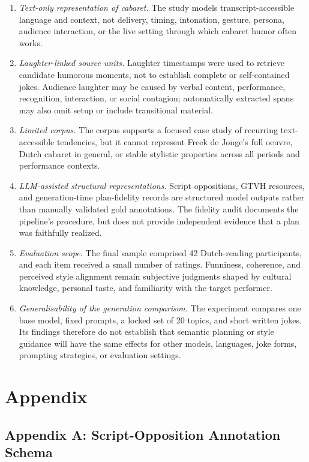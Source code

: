\documentclass[11pt]{article}
\providecommand{\tightlist}{}
\begin{document}
\begin{enumerate}
\def\labelenumi{\arabic{enumi}.}
\tightlist
\item
  \emph{Text-only representation of cabaret.} The study models transcript-accessible language and context, not delivery, timing, intonation, gesture, persona, audience interaction, or the live setting through which cabaret humor often works.
\item
  \emph{Laughter-linked source units.} Laughter timestamps were used to retrieve candidate humorous moments, not to establish complete or self-contained jokes. Audience laughter may be caused by verbal content, performance, recognition, interaction, or social contagion; automatically extracted spans may also omit setup or include transitional material.
\item
  \emph{Limited corpus.} The corpus supports a focused case study of recurring text-accessible tendencies, but it cannot represent Freek de Jonge's full oeuvre, Dutch cabaret in general, or stable stylistic properties across all periods and performance contexts.
\item
  \emph{LLM-assisted structural representations.} Script oppositions, GTVH resources, and generation-time plan-fidelity records are structured model outputs rather than manually validated gold annotations. The fidelity audit documents the pipeline's procedure, but does not provide independent evidence that a plan was faithfully realized.
\item
  \emph{Evaluation scope.} The final sample comprised 42 Dutch-reading participants, and each item received a small number of ratings. Funniness, coherence, and perceived style alignment remain subjective judgments shaped by cultural knowledge, personal taste, and familiarity with the target performer.
\item
  \emph{Generalisability of the generation comparison.} The experiment compares one base model, fixed prompts, a locked set of 20 topics, and short written jokes. Its findings therefore do not establish that semantic planning or style guidance will have the same effects for other models, languages, joke forms, prompting strategies, or evaluation settings.
\end{enumerate}

\section{Appendix}\label{appendix}

\subsection{Appendix A: Script-Opposition Annotation Schema}\label{appendix-a-script-opposition-annotation-schema}
\end{document}
